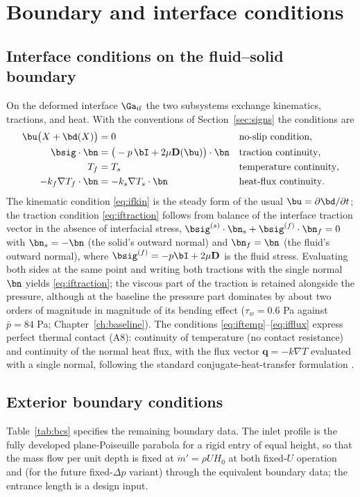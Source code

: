 \chapter{Boundary and interface conditions}
\label{ch:interface}

\section{Interface conditions on the fluid--solid boundary}
\label{sec:interface}
On the deformed interface $\Ga_{\mathrm{if}}$ the two subsystems exchange kinematics, tractions,
and heat. With the conventions of Section~\ref{sec:signs} the conditions are
\begin{align}
\bu\big(X+\bd(X)\big)&=0 &&\text{no-slip condition}, \label{eq:ifkin}\\
\bsig\cdot\bn &= \big(-p\,\bI+2\mu\mathbf D(\bu)\big)\cdot\bn &&\text{traction continuity}, \label{eq:iftraction}\\
T_f &= T_s &&\text{temperature continuity}, \label{eq:iftemp}\\
-k_f\nabla T_f\cdot\bn &= -k_s\nabla T_s\cdot\bn &&\text{heat-flux continuity}. \label{eq:ifflux}
\end{align}
The kinematic condition \eqref{eq:ifkin} is the steady form of the usual
$\bu=\partial\bd/\partial t$; the traction condition
\eqref{eq:iftraction} follows from balance of the interface traction vector in the absence of
interfacial stress, $\bsig^{(s)}\cdot\bn_s+\bsig^{(f)}\cdot\bn_f=0$ with $\bn_s=-\bn$ (the
solid's outward normal) and $\bn_f=\bn$ (the fluid's outward normal), where
$\bsig^{(f)}=-p\bI+2\mu\mathbf D$ is the fluid stress. Evaluating both sides at the same point and
writing both tractions with the single normal $\bn$ yields \eqref{eq:iftraction}; the viscous part of the traction is
retained alongside the pressure, although at the baseline the pressure part dominates by about two
orders of magnitude in magnitude of its bending effect ($\tau_w=0.6$ Pa against
$\bar p=84$ Pa; Chapter~\ref{ch:baseline}). The conditions \eqref{eq:iftemp}--\eqref{eq:ifflux}
express perfect thermal contact (A8): continuity of temperature (no contact resistance) and
continuity of the normal heat flux, with the flux vector $\mathbf q=-k\nabla T$ evaluated with a
single normal, following the standard conjugate-heat-transfer formulation
\cite{carslaw1947conduction}.

\section{Exterior boundary conditions}
\label{sec:bcs}
Table~\ref{tab:bcs} specifies the remaining boundary data. The inlet profile is the fully developed
plane-Poiseuille parabola for a rigid entry of equal height, so that the mass flow per unit depth
is fixed at $\dot m'=\rho UH_0$ at both fixed-$U$ operation and (for the future fixed-$\Delta p$
variant) through the equivalent boundary data; the entrance length is a design input.

